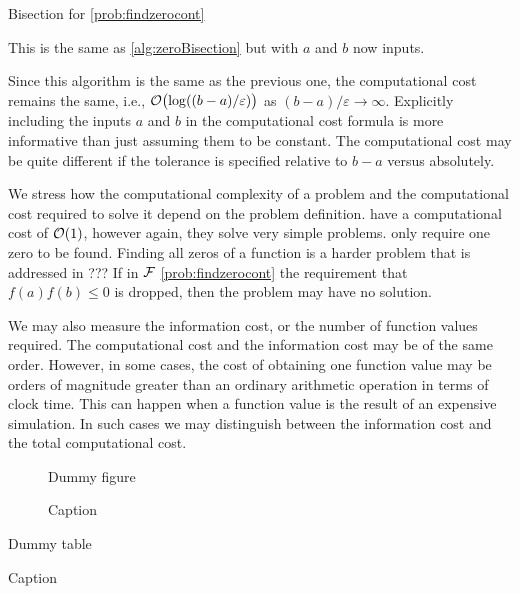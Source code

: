 \begin{algorithm}
\caption{Bisection for \cref{prob:findzerocont}  \label{alg:zeroBisectionAB}}
This is the same as \cref{alg:zeroBisection} but with $a$ and $b$ now inputs.
\end{algorithm}

Since this algorithm is the same as the previous one, the computational cost remains the same, i.e., $\operatorname{{\mathcal O}}\bigl(\log((b-a)/\varepsilon)\bigr)$ as $(b-a)/\varepsilon \to \infty$.  Explicitly including the inputs $a$ and $b$ in the computational cost formula is more informative than just assuming them to be constant.  The computational cost may be quite different if the tolerance is specified relative to $b-a$ versus absolutely.

We stress how the computational complexity of a problem and the computational cost required to solve it depend on the problem definition.   have a computational cost of $\operatorname{{\mathcal O}}(1)$, however again, they solve very simple problems.   only require one zero to be found.  Finding all zeros of a function is a harder problem that is addressed in ???  If in  $\mathcal{F}$ \cref{prob:findzerocont} the requirement that $f(a) f(b) \le 0$ is dropped, then the problem may have no solution. 

We may also measure the information cost, or the number of function values required.  The computational cost and the information cost may be of the same order.  However, in some cases, the cost of obtaining one function value may be orders of magnitude greater than an ordinary arithmetic operation in terms of clock time.  This can happen when a function value is the result of an expensive simulation.  In such cases we may distinguish between the information cost and the total computational cost.



\begin{figure}
    \centering
    Dummy figure
    \caption{Caption}
    \label{fig:my_label}
\end{figure}

\begin{table}[]
    \centering
   Dummy table
    \caption{Caption}
    \label{tab:my_label}
\end{table}